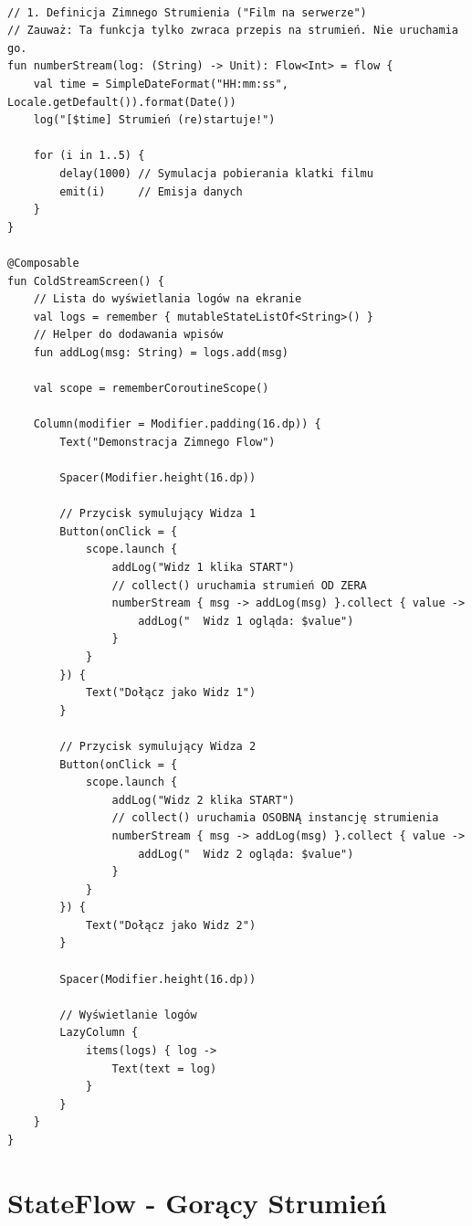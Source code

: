 \begin{verbatim}

// 1. Definicja Zimnego Strumienia ("Film na serwerze")
// Zauważ: Ta funkcja tylko zwraca przepis na strumień. Nie uruchamia go.
fun numberStream(log: (String) -> Unit): Flow<Int> = flow {
    val time = SimpleDateFormat("HH:mm:ss", Locale.getDefault()).format(Date())
    log("[$time] Strumień (re)startuje!")
    
    for (i in 1..5) {
        delay(1000) // Symulacja pobierania klatki filmu
        emit(i)     // Emisja danych
    }
}

@Composable
fun ColdStreamScreen() {
    // Lista do wyświetlania logów na ekranie
    val logs = remember { mutableStateListOf<String>() }
    // Helper do dodawania wpisów
    fun addLog(msg: String) = logs.add(msg)

    val scope = rememberCoroutineScope()

    Column(modifier = Modifier.padding(16.dp)) {
        Text("Demonstracja Zimnego Flow")
        
        Spacer(Modifier.height(16.dp))

        // Przycisk symulujący Widza 1
        Button(onClick = {
            scope.launch {
                addLog("Widz 1 klika START")
                // collect() uruchamia strumień OD ZERA
                numberStream { msg -> addLog(msg) }.collect { value ->
                    addLog("  Widz 1 ogląda: $value")
                }
            }
        }) {
            Text("Dołącz jako Widz 1")
        }

        // Przycisk symulujący Widza 2
        Button(onClick = {
            scope.launch {
                addLog("Widz 2 klika START")
                // collect() uruchamia OSOBNĄ instancję strumienia
                numberStream { msg -> addLog(msg) }.collect { value ->
                    addLog("  Widz 2 ogląda: $value")
                }
            }
        }) {
            Text("Dołącz jako Widz 2")
        }

        Spacer(Modifier.height(16.dp))

        // Wyświetlanie logów
        LazyColumn {
            items(logs) { log ->
                Text(text = log)
            }
        }
    }
}
\end{verbatim}

\section{StateFlow - Gorący Strumień}

